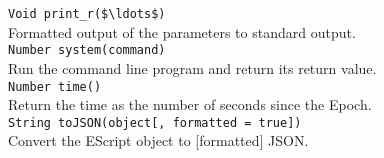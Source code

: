 \documentclass[paper=A4,paper=landscape,pagesize,9pt,DIV=30]{scrartcl}
\begin{document}
\begin{multicols}{3}
\lstinline!Void print_r($\ldots$)! \\
\hspace*{2mm}Formatted output of the parameters to standard output. \\
\lstinline!Number system(command)! \\
\hspace*{2mm}Run the command line program and return its return value. \\
\lstinline!Number time()! \\
\hspace*{2mm}Return the time as the number of seconds since the Epoch. \\
\lstinline!String toJSON(object[, formatted = true])! \\
\hspace*{2mm}Convert the EScript object to [formatted] JSON.
\end{multicols}
\end{document}
